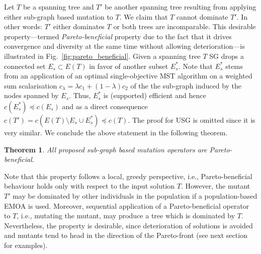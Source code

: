 \documentclass[twoside]{article}
\newtheorem{theorem}{Theorem}
\begin{document}
Let $T$ be a spanning tree and $T'$ be another spanning tree resulting from applying either sub-graph based mutation to $T$. We claim that $T$ cannot dominate $T'$. In other words: $T'$ either dominates $T$ or both trees are incomparable. This desirable property---termed \emph{Pareto-beneficial} property due to the fact that it drives convergence and diversity at the
same time without allowing deterioration---is illustrated in Fig.~\ref{fig:pareto_beneficial}.
Given a spanning tree $T$ SG drops a connected set $E_s \subset E(T)$ in favor of another subset $E_s^{*}$. Note that $E_s^{*}$ stems from an application of an optimal single-objective MST algorithm on a weighted sum scalarisation $c_{\lambda} = \lambda c_1 + (1 - \lambda)c_2$ of the the sub-graph induced by the nodes spanned by $E_s$. Thus, $E_s^{*}$ is (supported) efficient and hence $c(E_s^{*}) \preceq c(E_s)$ and as a direct consequence $c(T') = c(E(T) \setminus E_s \cup E_s^{*}) \preceq c(T)$. The proof for USG is omitted since it is very similar. We conclude the above statement in the following theorem.
\begin{theorem}
All proposed sub-graph based mutation operators are Pareto-beneficial.
\end{theorem}
Note that this property follows a local, greedy perspective, i.e., Pareto-beneficial behaviour holds only with respect to the input solution $T$. However, the mutant $T'$ may be dominated by other individuals in the population if a population-based EMOA is used. Moreover, sequential application of a Pareto-beneficial operator to $T$, i.e., mutating the mutant, may produce a tree which is dominated by $T$. Nevertheless, the property is desirable, since deterioration of solutions is avoided and mutants tend to head in the direction of the Pareto-front (see next section for examples).
\end{document}
